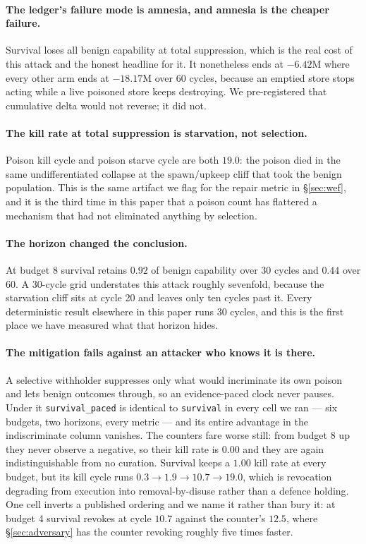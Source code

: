 \paragraph{The ledger's failure mode is amnesia, and amnesia is the
cheaper failure.} Survival loses all benign capability at total
suppression, which is the real cost of this attack and the honest
headline for it. It nonetheless ends at $-6.42$M where every other arm
ends at $-18.17$M over 60 cycles, because an emptied store stops acting
while a live poisoned store keeps destroying. We pre-registered that
cumulative delta would not reverse; it did not.

\paragraph{The kill rate at total suppression is starvation, not
selection.} Poison kill cycle and poison starve cycle are both $19.0$:
the poison died in the same undifferentiated collapse at the
$\text{spawn}/\text{upkeep}$ cliff that took the benign population. This
is the same artifact we flag for the repair metric in
\S\ref{sec:wef}, and it is the third time in this paper that a poison
count has flattered a mechanism that had not eliminated anything by
selection.

\paragraph{The horizon changed the conclusion.} At budget 8 survival
retains $0.92$ of benign capability over 30 cycles and $0.44$ over 60. A
30-cycle grid understates this attack roughly sevenfold, because the
starvation cliff sits at cycle 20 and leaves only ten cycles past it.
Every deterministic result elsewhere in this paper runs 30 cycles, and
this is the first place we have measured what that horizon hides.

\paragraph{The mitigation fails against an attacker who knows it is
there.} A selective withholder suppresses only what would incriminate its
own poison and lets benign outcomes through, so an evidence-paced clock
never pauses. Under it \texttt{survival\_paced} is identical to
\texttt{survival} in every cell we ran --- six budgets, two horizons,
every metric --- and its entire advantage in the indiscriminate column
vanishes. The counters fare worse still: from budget 8 up they never
observe a negative, so their kill rate is $0.00$ and they are again
indistinguishable from no curation. Survival keeps a $1.00$ kill rate at
every budget, but its kill cycle runs $0.3 \rightarrow 1.9 \rightarrow
10.7 \rightarrow 19.0$, which is revocation degrading from execution into
removal-by-disuse rather than a defence holding. One cell inverts a
published ordering and we name it rather than bury it: at budget 4
survival revokes at cycle $10.7$ against the counter's $12.5$, where
\S\ref{sec:adversary} has the counter revoking roughly five times faster.

